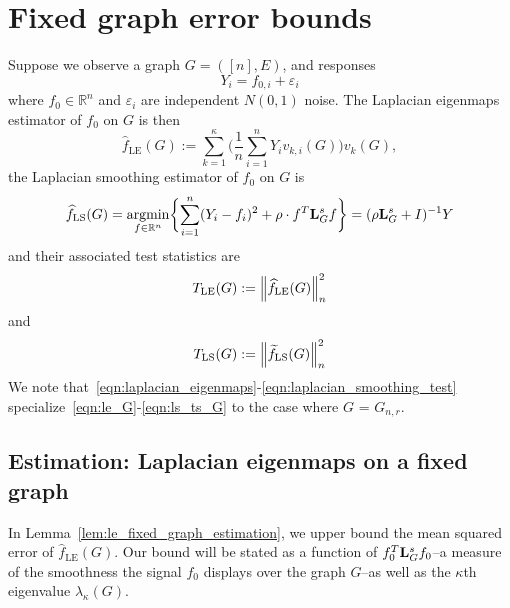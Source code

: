 \documentclass{article}
\newcommand{\Reals}{\mathbb{R}}
\newcommand{\1}{\mathbf{1}}
\DeclareMathOperator*{\argmin}{argmin}
\newcommand{\Lap}{{\bf L}}
\newcommand{\wt}[1]{\widetilde{#1}}
\newcommand{\wh}[1]{\widehat{#1}}
\newcommand{\LE}{\mathrm{LE}}
\newcommand{\LS}{\mathrm{LS}}
\theoremstyle{alden}
\theoremstyle{aldenthm}
\theoremstyle{definition}
\theoremstyle{remark}
\begin{document}
\section{Fixed graph error bounds}
\label{sec:fixed_graph_error_bounds}

Suppose we observe a graph $G = ([n],E)$, and responses
\begin{equation}
\label{eqn:fixed_graph_regression_model}
Y_i = f_{0,i} + \varepsilon_i
\end{equation}
where $f_0 \in \Reals^n$ and $\varepsilon_i$ are independent $N(0,1)$ noise. The Laplacian eigenmaps estimator of $f_0$ on $G$ is then
\begin{equation}
\label{eqn:le_G}
\wh{f}_{\LE}(G) := \sum_{k = 1}^{\kappa} \biggl(\frac{1}{n}\sum_{i = 1}^{n} Y_i v_{k,i}(G) \biggr) v_k(G),
\end{equation}
the Laplacian smoothing estimator of $f_0$ on $G$ is
\begin{equation}
\label{eqn:ls_G}
\wh{f}_{\LS}(G) = \argmin_{f \in \Reals^n} \biggl\{ \sum_{i = 1}^{n}(Y_i - f_i)^2 + \rho \cdot f^T \Lap_G^{s}  f \biggr\} = (\rho \Lap_G^s + I)^{-1}Y
\end{equation}
and their associated test statistics are
\begin{equation}
\label{eqn:le_ts_G}
T_{\LE}(G) := \Bigl\|\wh{f}_{\LE}(G)\Bigr\|_n^2
\end{equation}
and
\begin{equation}
\label{eqn:ls_ts_G}
T_{\LS}(G) := \Bigl\|\wt{f}_{\LS}(G)\Bigr\|_n^2
\end{equation}
We note that~\eqref{eqn:laplacian_eigenmaps}-\eqref{eqn:laplacian_smoothing_test} specialize~\eqref{eqn:le_G}-\eqref{eqn:ls_ts_G} to the case where $G$ = $G_{n,r}$.

\subsection{Estimation: Laplacian eigenmaps on a fixed graph}


In Lemma~\ref{lem:le_fixed_graph_estimation}, we upper bound the mean squared error of $\wh{f}_{\LE}(G)$. Our bound will be stated as a function of $f_0^T \Lap_G^s f_0$--a measure of the smoothness the signal $f_0$ displays over the graph $G$--as well as the $\kappa$th eigenvalue $\lambda_{\kappa}(G)$.
\end{document}
